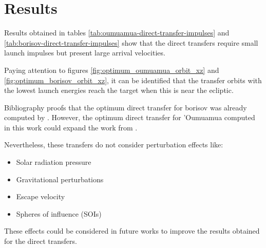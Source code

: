 \section{Results}

Results obtained in tables \ref{tab:oumuamua-direct-transfer-impulses} and
\ref{tab:borisov-direct-transfer-impulses} show that the direct transfers require
small launch impulses but present large arrival velocities.

Paying attention to figures \ref{fig:optimum_oumuamua_orbit_xz} and
\ref{fig:optimum_borisov_orbit_xz}, it can be identified that the transfer orbits
with the lowest launch energies reach the target when this is near the ecliptic.

Bibliography proofs that the optimum direct transfer for borisov was already
computed by \cite{hibberd2021}. However, the optimum direct transfer for
'Oumuamua computed in this work could expand the work from \cite{hein2018}.

Nevertheless, these transfers do not consider perturbation effects like:

\begin{itemize}
  \item Solar radiation pressure
  \item Gravitational perturbations
  \item Escape velocity
  \item Spheres of influence (SOIs)
\end{itemize}

These effects could be considered in future works to improve the results
obtained for the direct transfers.

